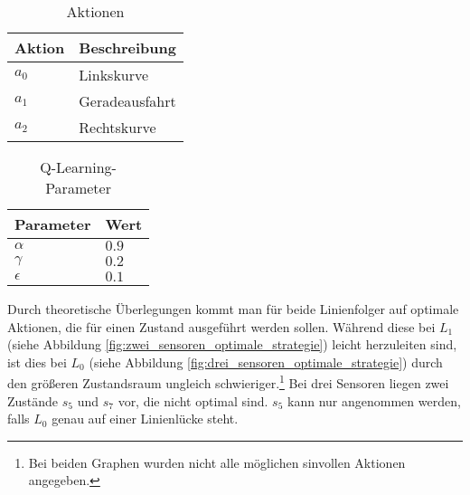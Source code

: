 \begin{table}[H]
  \caption{Aktionen}
  \label{tab:aktionen}
  \renewcommand{\arraystretch}{1.2}
  \centering
  \sffamily
  \begin{footnotesize}
    \begin{tabular}{l l}
    \toprule
    \textbf{Aktion} & \textbf{Beschreibung}\\
    \midrule
    $a_0$	&	Linkskurve\\
    $a_1$	&	Ge­ra­de­aus­fahrt\\
    $a_2$	&	Rechtskurve\\
    \bottomrule
    \end{tabular}
  \end{footnotesize}
  \rmfamily
\end{table}
\quad
\begin{table}[H]
  \caption{Q-Learning-Parameter}
  \label{tab:q-parameter}
  \renewcommand{\arraystretch}{1.2}
  \centering
  \sffamily
  \begin{footnotesize}
    \begin{tabular}{l l}
    \toprule
    \textbf{Parameter} & \textbf{Wert}\\
    \midrule
    $\alpha$	&	$0.9$\\
    $\gamma$	&	$0.2$\\
    $\epsilon$	&	$0.1$\\
    \bottomrule
    \end{tabular}
  \end{footnotesize}
  \rmfamily
\end{table}

Durch theoretische Überlegungen kommt man für beide Linienfolger auf optimale Aktionen, die für einen Zustand ausgeführt werden sollen. Während diese bei $L_1$ (siehe Abbildung \ref{fig:zwei_sensoren_optimale_strategie}) leicht herzuleiten sind, ist dies bei $L_0$ (siehe Abbildung \ref{fig:drei_sensoren_optimale_strategie}) durch den größeren Zustandsraum ungleich schwieriger.\footnote{Bei beiden Graphen wurden nicht alle möglichen sinvollen Aktionen angegeben.} Bei drei Sensoren liegen zwei Zustände $s_5$ und $s_7$ vor, die nicht optimal sind. $s_5$ kann nur angenommen werden, falls $L_0$ genau auf einer Linienlücke steht.

